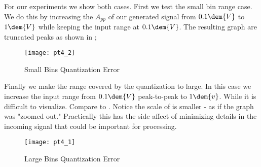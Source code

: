 \documentclass[main.tex]{subfile}
\begin{document}
For our experiments we show both cases. First we test the small bin range case.
We do this by increasing the $A_{pp}$ of our generated signal from $0.1\dem{V}$
to $1\dem{V}$ while keeping the input range at $0.1\dem{V}$. The resulting graph
are truncated peaks as shown in ;

\begin{figure}[H]
	\begin{center}
		\texttt{[image: pt4\_2]}
	\end{center}
	\caption{Small Bins Quantization Error}
	\label{fig:smallQ}
\end{figure}

Finally we make the range covered by the quantization to large. In this case we
increase the input range from $0.1\dem{V}$ peak-to-peak to $1\dem{v}$. While it
is difficult to visualize. Compare  to . Notice the
scale of  is smaller - as if the graph was "zoomed out."
Practically this has the side affect of minimizing details in the incoming
signal that could be important for processing. 

\begin{figure}[H]
	\begin{center}
		\texttt{[image: pt4\_1]}
	\end{center}
	\caption{Large Bins Quantization Error}
	\label{fig:bigQ}
\end{figure}


\end{document}
